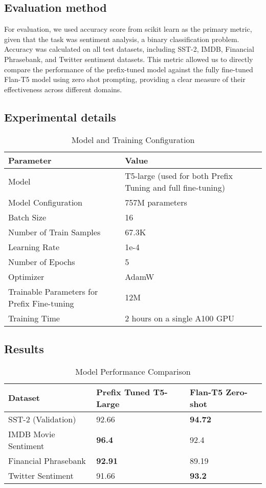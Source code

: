 \documentclass{article}
\begin{document}
\subsection{Evaluation method}
For evaluation, we used accuracy score from scikit learn as the primary metric, given that the task was sentiment analysis, a binary classification problem. Accuracy was calculated on all test datasets, including SST-2, IMDB, Financial Phrasebank, and Twitter sentiment datasets. This metric allowed us to directly compare the performance of the prefix-tuned model against the fully fine-tuned Flan-T5 model using zero shot prompting, providing a clear measure of their effectiveness across different domains.
\newpage
\subsection{Experimental details}
\begin{table}[h!]
  \centering
  \begin{tabular}{|l|l|}
  \hline
  \textbf{Parameter} & \textbf{Value} \\ \hline
  Model & T5-large (used for both Prefix Tuning and full fine-tuning) \\ \hline
  Model Configuration & 757M parameters \\ \hline
  Batch Size & 16 \\ \hline
  Number of Train Samples & 67.3K \\ \hline
  Learning Rate & 1e-4 \\ \hline
  Number of Epochs & 5 \\ \hline
  Optimizer & AdamW \\ \hline
  Trainable Parameters for Prefix Fine-tuning & 12M \\ \hline
  Training Time & 2 hours on a single A100 GPU \\ \hline
  \end{tabular}
  \caption{Model and Training Configuration}
  \end{table}

\subsection{Results}
\begin{table}[h!]
  \centering
  \begin{tabular}{|l|l|l|}
  \hline
  \textbf{Dataset} & \textbf{Prefix Tuned T5-Large} & \textbf{Flan-T5 Zero-shot} \\ \hline
  SST-2 (Validation) & 92.66 & \textbf{94.72} \\ \hline
  IMDB Movie Sentiment & \textbf{96.4} & 92.4 \\ \hline
  Financial Phrasebank & \textbf{92.91} & 89.19  \\ \hline
  Twitter Sentiment & 91.66 & \textbf{93.2} \\ \hline

  \end{tabular}
  \caption{Model Performance Comparison}
  \end{table}
  
\end{document}
